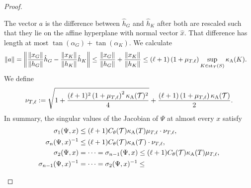 \documentclass[10pt,a4paper]{article}
\begin{document}
\begin{proof}
\begin{itemize}
        The vector $a$ is the difference between $\hat h_{G}$ and $\hat h_{K}$ after both are rescaled such that they lie on the affine hyperplane with normal vector $\hat x$. That difference has length at most $\tan(\alpha_{G}) + \tan(\alpha_{K})$.
        We calculate 
        \begin{align*}
            \|a\|
            = 
            \left\|
            \frac{\|x_{G}\|}{\|h_{G}\|} \hat h_{{G}} 
            - 
            \frac{\|x_{K}\|}{\|h_{K}\|} \hat h_K
            \right\|
            &
            \leq 
            \frac{\|x_{G}\|}{\|h_{G}\|} 
            + 
            \frac{\|x_{K}\|}{\|h_{K}\|} 
            \leq 
            (\ell+1) 
            \left( 1 + \mu_{T,\ell} \right)
            \sup_{ K \in \patch_{\calT}(S) }
            \aspectratio(K) %
            .
        \end{align*}
        We define 
        \begin{align}
            \nu_{T,\ell} := \sqrt{ 1 + \frac{ (\ell+1)^{2}\left( 1 + \mu_{T,\ell} \right)^{2} \kappa_{\rm A}({\mathcal T})^{2} }{4} } + \frac{ (\ell+1)\left( 1 + \mu_{T,\ell} \right) \kappa_{\rm A}({\mathcal T}) }{2}
            .
        \end{align}
        In summary, 
        the singular values of the Jacobian of $\Psi$ at almost every $x$ satisfy 
        \begin{align}
            \sigma_{1}(\Psi,x) %
            &\leq  
            (\ell+1)
            \diameterratio(\calT)
            \aspectratio(T)\mu_{T,\ell} %
            \cdot 
            \nu_{T,\ell}
            ,
            \\
            \sigma_{n}(\Psi,x)^{-1} %
            &\leq  
            (\ell+1)
            \diameterratio(\calT)
            \aspectratio(\calT) 
            \cdot 
            \nu_{T,\ell}
            ,
            \\
            \sigma_{  2}(\Psi,x) 
            &= 
            \dots
            =
            \sigma_{n-1}(\Psi,x) 
            \leq 
            (\ell+1) \diameterratio(\calT) \aspectratio(T)\mu_{T,\ell}
            ,
            \\
            \sigma_{n-1}(\Psi,x)^{-1} 
            &= 
            \dots
            =
            \sigma_{  2}(\Psi,x)^{-1} 
            \leq 

\end{align}
\end{itemize}
\end{proof}
\end{document}
